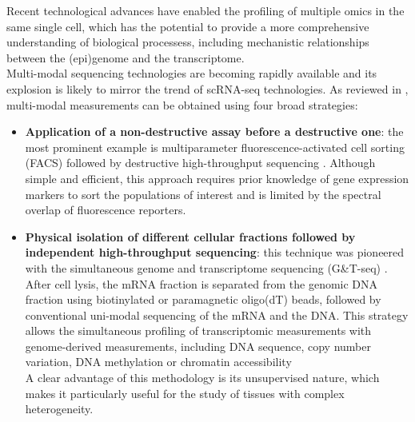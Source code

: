 Recent technological advances have enabled the profiling of multiple omics in the same single cell, which has the potential to provide a more comprehensive understanding of biological processess, including mechanistic relationships between the (epi)genome and the transcriptome.\\
Multi-modal sequencing technologies are becoming rapidly available and its explosion is likely to mirror the trend of scRNA-seq technologies. As reviewed in \cite{Stuart2019,Chappell2018}, multi-modal measurements can be obtained using four broad strategies:
\begin{itemize}
	
	\item \textbf{Application of a non-destructive assay before a destructive one}: the most prominent example is multiparameter fluorescence-activated cell sorting (FACS) followed by destructive high-throughput sequencing \cite{Paul2015}. Although simple and efficient, this approach requires prior knowledge of gene expression markers to sort the populations of interest and is limited by the spectral overlap of fluorescence reporters.

	\item \textbf{Physical isolation of different cellular fractions followed by independent high-throughput sequencing}: this technique was pioneered with the simultaneous genome and transcriptome sequencing (G\&T-seq) \cite{Macaulay2015}. After cell lysis, the mRNA fraction is separated from the genomic DNA fraction using biotinylated or paramagnetic oligo(dT) beads, followed by conventional uni-modal sequencing of the mRNA and the DNA. This strategy allows the simultaneous profiling of transcriptomic measurements with genome-derived measurements, including DNA sequence, copy number variation, DNA methylation or chromatin accessibility \cite{Macaulay2015,Hou2016,Angermueller2016,Hu2016}\\
	A clear advantage of this methodology is its unsupervised nature, which makes it particularly useful for the study of tissues with complex heterogeneity.


\end{itemize}
